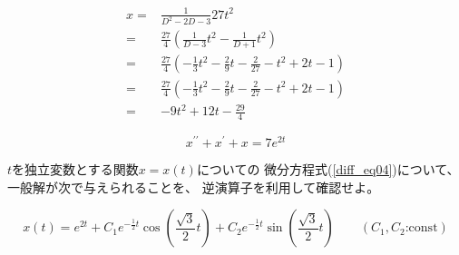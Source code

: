 \documentclass[12pt,b5paper]{ltjsarticle}
\begin{document}
\begin{align}
 x =& \frac{1}{D^2-2D-3}27t^2\\
 =& \frac{27}{4}\left( \frac{1}{D-3}t^2-\frac{1}{D+1}t^2 \right)\\
 =& \frac{27}{4}\left( -\frac{1}{3} t^2 - \frac{2}{9}t - \frac{2}{27} - t^2 + 2 t - 1 \right)\\
 =& \frac{27}{4}\left( -\frac{1}{3} t^2 - \frac{2}{9}t - \frac{2}{27} - t^2 + 2 t - 1 \right)\\
 =& -9 t^2 +12 t - \frac{29}{4}
 \end{align}



\hrulefill

\begin{equation}
 x^{\prime\prime}+x^{\prime}+x=7e^{2t}
  \label{diff_eq04}
\end{equation}

$t$を独立変数とする関数$x=x(t)$についての
微分方程式(\ref{diff_eq04})について、
一般解が次で与えられることを、
逆演算子を利用して確認せよ。

\begin{equation}
 x(t)=e^{2t}
  +C_1e^{-\frac{1}{2}t}\cos{\left(\frac{\sqrt{3}}{2}t\right)}
  +C_2e^{-\frac{1}{2}t}\sin{\left(\frac{\sqrt{3}}{2}t\right)}
  \qquad
  (C_1,C_2\text{:const})
\end{equation}


\dotfill




\hrulefill
\end{document}
